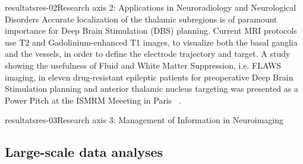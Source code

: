 \documentclass{ra2018}
\begin{document}
\begin{module}{resultats}{res-02}{Research axis 2: Applications in Neuroradiology and Neurological Disorders}
Accurate localization of the thalamic subregions is of paramount importance for Deep Brain Stimulation (DBS) planning. Current MRI protocols use T2 and Gadolinium-enhanced T1 images, to visualize both the basal ganglia and the vessels, in order to define the electrode trajectory and target. A study showing the usefulness of Fluid and White Matter Suppression, i.e. FLAWS imaging, in eleven drug-resistant epileptic patients for preoperative Deep Brain Stimulation planning and anterior thalamic nucleus targeting was presented as a Power Pitch at the ISMRM Meeeting in Paris ~\cite{bannier:inserm-01939451}.

\end{module}

\begin{module}{resultats}{res-03}{Research axis 3: Management of Information in Neuroimaging}

\subsection{Large-scale data analyses}

\end{module}
\end{document}
